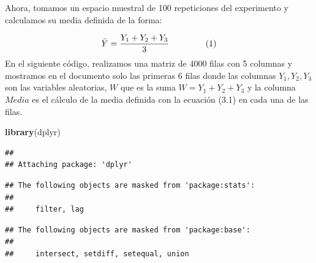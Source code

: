 \documentclass[
]{article}
\newenvironment{Shaded}{\begin{snugshade}}{\end{snugshade}}
\newcommand{\FunctionTok}[1]{\textcolor[rgb]{0.13,0.29,0.53}{\textbf{#1}}}
\newcommand{\NormalTok}[1]{#1}
\begin{document}
Ahora, tomamos un espacio muestral de 100 repeticiones del experimento y calculamos su media definida de la forma:

$$\bar{Y}=\frac{Y_{1}+Y_{2}+Y_{3}}{3} \hspace{1.5cm} (1)$$
En el siguiente código, realizamos una matriz de 4000 filas con 5 columnas y mostramos en el documento solo las primeras 6 filas donde las columnas $Y_{1}, Y_{2}, Y_{3}$ son las variables aleatorias, $W$ que es la suma $W=Y_{1}+Y_{2}+Y_{3}$ y la columna $Media$ es el cálculo de la media  definida con la ecuación (3.1) en cada una de las filas. 

\begin{Shaded}
\begin{Highlighting}[]
\FunctionTok{library}\NormalTok{(dplyr)}
\end{Highlighting}
\end{Shaded}

\begin{verbatim}
## 
## Attaching package: 'dplyr'
\end{verbatim}

\begin{verbatim}
## The following objects are masked from 'package:stats':
## 
##     filter, lag
\end{verbatim}

\begin{verbatim}
## The following objects are masked from 'package:base':
## 
##     intersect, setdiff, setequal, union
\end{verbatim}
\end{document}
